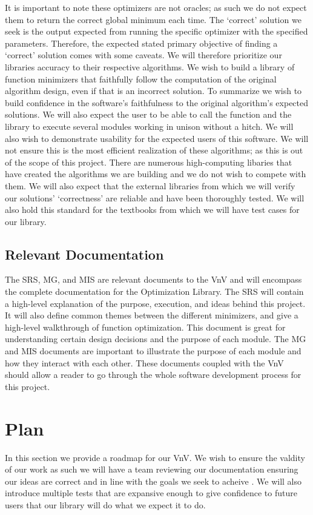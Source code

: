 \documentclass[12pt, titlepage]{article}
\begin{document}
It is important to note these optimizers are not oracles; as such we do not
expect them to return the correct global minimum each time. The `correct' solution we seek is the output expected from running
the specific optimizer with the specified parameters. Therefore, the expected stated primary objective of finding a `correct' 
solution comes with some caveats. We will therefore prioritize our libraries accuracy to their respective algorithms. We wish
to build a library of function minimizers that faithfully follow the computation of the original algorithm design, even if that
is an incorrect solution.  To summarize we wish to build confidence in the software's faithfulness to the original algorithm's 
expected solutions. We will also expect the user to be able to call the function and the library to execute several modules working
in unison without a hitch. 
We will also wish to demonstrate usability for the expected users of this software. We will not ensure this is the most efficient 
realization of these algorithms; as this is out of the scope of this project. There are numerous high-computing libaries that have
created the algorithms we are building and we do not wish to compete with them. We will also expect that the external libraries from 
which we will verify our solutions' `correctness' are reliable and have been thoroughly tested. We will also hold this standard for
the textbooks from which we will have test cases for our library. 


\subsection{Relevant Documentation}
The SRS, MG, and MIS are relevant documents to the VnV and will encompass the complete
documentation for the Optimization Library. The SRS will contain a high-level explanation
of the purpose, execution, and ideas behind this project. It will also define common themes
between the different minimizers, and give a high-level walkthrough of function optimization. 
This document is great for understanding certain design decisions and the purpose of each module.
The MG and MIS documents are important to illustrate the purpose of each module and how they
interact with each other. These documents coupled with the VnV should allow a reader to go through 
the whole software development process for this project.

\citet{SRS}

\section{Plan}
In this section we provide a roadmap for our VnV. We wish to ensure the valdity of our work
as such we will have a team reviewing our documentation ensuring our ideas are correct and in 
line with the goals we seek to acheive \citep{SRS}. We will also introduce multiple tests that 
are expansive enough to give confidence to future users that our library will do what we expect
it to do. 
\end{document}
